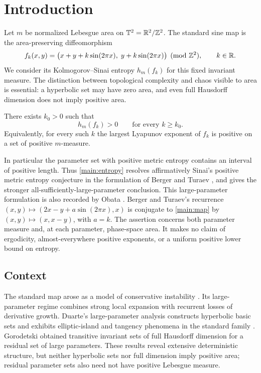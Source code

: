 \section{Introduction}
\label{sec:introduction}

Let $m$ be normalized Lebesgue area on $\mathbb{T}^2=\mathbb{R}^2/\mathbb{Z}^2$.
The standard sine map is the area-preserving diffeomorphism
\begin{equation}\label{main:map}
 f_k(x,y)=\bigl(x+y+k\sin(2\pi x),\;y+k\sin(2\pi x)\bigr)
 \pmod{\mathbb{Z}^2},\qquad k\in\mathbb{R}.
\end{equation}
We consider its Kolmogorov--Sinai entropy $h_m(f_k)$ for this fixed
invariant measure. The distinction between topological complexity and
chaos visible to area is essential: a hyperbolic set may have zero area,
and even full Hausdorff dimension does not imply positive area.

\begin{theorem}\label{main:entropy}
There exists $k_0>0$ such that
\[
 h_m(f_k)>0\qquad\text{for every }k\ge k_0.
\]
Equivalently, for every such $k$ the largest Lyapunov exponent of $f_k$
is positive on a set of positive $m$-measure.
\end{theorem}

In particular the parameter set with positive metric entropy contains
an interval of positive length. Thus \cref{main:entropy} resolves
affirmatively Sinai's positive metric entropy conjecture in the
formulation of Berger and Turaev
\cite[Conjecture~0.4]{BergerTuraev2019}, and gives the stronger
all-sufficiently-large-parameter conclusion. This large-parameter
formulation is also recorded by Obata \cite{Obata2021}.
Berger and Turaev's recurrence
$(x,y)\mapsto(2x-y+a\sin(2\pi x),x)$ is conjugate to
\cref{main:map} by $(x,y)\mapsto(x,x-y)$, with $a=k$.
The assertion concerns both parameter measure and, at each parameter,
phase-space area. It makes no claim of ergodicity, almost-everywhere
positive exponents, or a uniform positive lower bound on entropy.

\subsection*{Context}

The standard map arose as a model of conservative instability
\cite{Chirikov1979}. Its large-parameter regime combines strong local
expansion with recurrent losses of derivative growth. Duarte's
large-parameter analysis constructs hyperbolic basic sets and exhibits
elliptic-island and tangency phenomena in the standard family
\cite{Duarte1994}. Gorodetski \cite{Gorodetski2012} obtained transitive
invariant sets of full Hausdorff dimension for a residual set of large
parameters. These results reveal extensive deterministic structure,
but neither hyperbolic sets nor full dimension imply positive area;
residual parameter sets also need not have positive Lebesgue measure.

